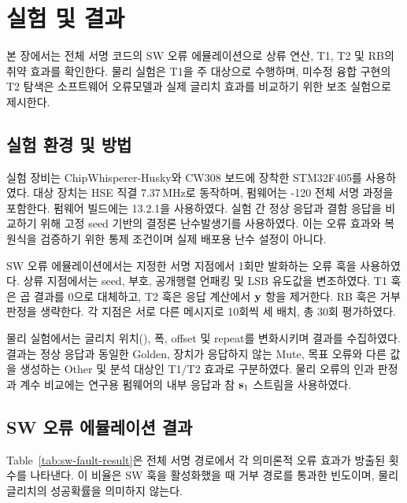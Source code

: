 \section{실험 및 결과}
\label{sec:experiments}

본 장에서는 전체 서명 코드의 SW 오류 에뮬레이션으로 상류 연산,
T1, T2 및 RB의 취약 효과를 확인한다. 물리 실험은 T1을 주 대상으로
수행하며, 미수정 융합 구현의 T2 탐색은 소프트웨어 오류모델과 실제
글리치 효과를 비교하기 위한 보조 실험으로 제시한다.

\subsection{실험 환경 및 방법}

실험 장비는 ChipWhisperer-Husky와 CW308 보드에 장착한
STM32F405를 사용하였다. 대상 장치는 HSE 직결 7.37\,MHz로
동작하며, 펌웨어는 -120 전체 서명 과정을 포함한다.
펌웨어 빌드에는  13.2.1을 사용하였다.
실험 간 정상 응답과 결함 응답을 비교하기 위해 고정 seed 기반의
결정론 난수발생기를 사용하였다. 이는 오류 효과와 복원식을 검증하기
위한 통제 조건이며 실제 배포용 난수 설정이 아니다.

SW 오류 에뮬레이션에서는 지정한 서명 지점에서 1회만 발화하는 오류
훅을 사용하였다. 상류 지점에서는 seed, 부호, 공개행렬 언패킹 및 LSB
유도값을 변조하였다. T1 훅은 곱 결과를 0으로 대체하고, T2 훅은
응답 계산에서 $\mathbf{y}$ 항을 제거한다. RB 훅은 거부 판정을 생략한다.
각 지점은 서로 다른 메시지로 10회씩 세 배치, 총 30회 평가하였다.

물리 실험에서는 글리치 위치(), 폭, offset 및
repeat를 변화시키며 결과를 수집하였다. 결과는 정상 응답과 동일한
Golden, 장치가 응답하지 않는 Mute, 목표 오류와 다른 값을 생성하는
Other 및 분석 대상인 T1/T2 효과로 구분하였다. 물리 오류의 인과
판정과 계수 비교에는 연구용 펌웨어의 내부 응답과 참 $\mathbf{s}_1$
스트림을 사용하였다.

\subsection{SW 오류 에뮬레이션 결과}
\label{subsec:software-faults}

Table~\ref{tab:sw-fault-result}은 전체 서명 경로에서 각 의미론적 오류
효과가 방출된 횟수를 나타낸다. 이 비율은 SW 훅을 활성화했을 때 거부
경로를 통과한 빈도이며, 물리 글리치의 성공확률을 의미하지 않는다.


